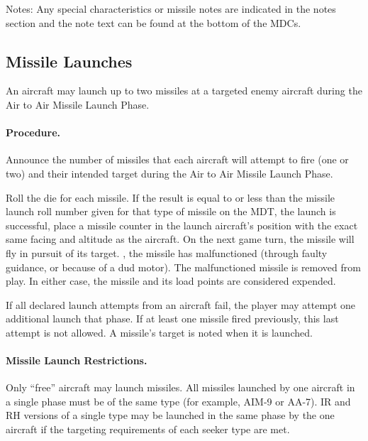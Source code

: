 Notes: Any special characteristics or missile notes are indicated in the notes section and the note text can be found at the bottom of the MDCs.

\subsection{Missile Launches}

An aircraft may launch up to two missiles at a targeted enemy aircraft during the Air to Air Missile Launch Phase.

\paragraph{Procedure.} Announce the number of missiles that each aircraft will attempt to fire (one or two) and their intended target during the Air to Air Missile Launch Phase.

Roll the die for each missile. If the result is equal to or less than the missile launch roll number given for that type of missile on the MDT, the launch is successful, place a missile counter in the launch aircraft's position with the exact same facing and altitude as the aircraft. On the next game turn, the missile will fly in pursuit of its target. , the missile has malfunctioned (through faulty guidance, or because of a dud motor). The malfunctioned missile is removed from play. In either case, the missile and its load points are considered expended. 

If all declared launch attempts from an aircraft fail, the player may attempt one additional launch that phase. If at least one missile fired previously, this last attempt is not allowed. A missile's target is noted when it is launched.

\paragraph{Missile Launch Restrictions.} Only “free” aircraft may launch missiles. All missiles launched by one aircraft in a single phase must be of the same type (for example, AIM-9 or AA-7). IR and RH versions of a single type may be launched in the same phase by the one aircraft if the targeting requirements of each seeker type are met.


